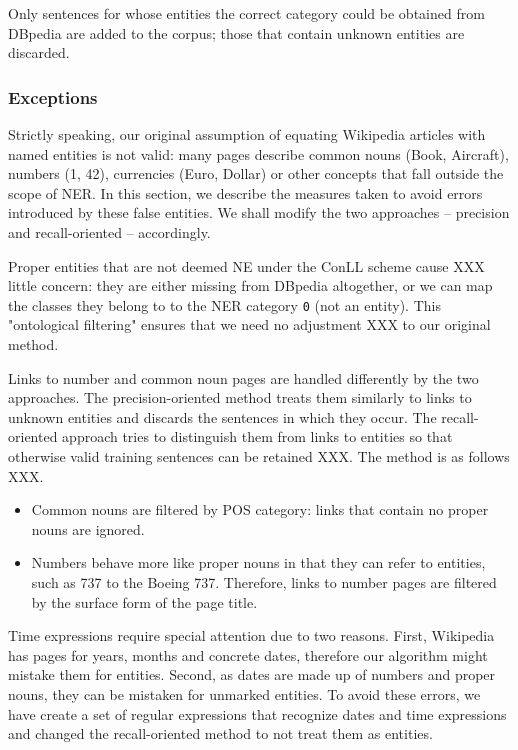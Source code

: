 \documentclass[11pt]{article}
\begin{document}
Only sentences for whose entities the correct category could be obtained from DBpedia are added to the corpus; those that contain unknown entities are discarded. 



\subsubsection{Exceptions}

Strictly speaking, our original assumption of equating Wikipedia articles with named entities is not valid: many pages describe common nouns (Book, Aircraft), numbers (1, 42), currencies (Euro, Dollar) or other concepts that fall outside the scope of NER. In this section, we describe the measures taken to avoid errors introduced by these false entities. We shall modify the two approaches -- precision and recall-oriented -- accordingly.

Proper entities that are not deemed NE under the ConLL scheme cause XXX little concern: they are either missing from DBpedia altogether, or we can map the classes they belong to to the NER category \texttt{0} (not an entity). This "ontological filtering" ensures that we need no adjustment XXX to our original method.

Links to number and common noun pages are handled differently by the two approaches. The precision-oriented method treats them similarly to links to unknown entities and discards the sentences in which they occur. The recall-oriented approach tries to distinguish them from links to entities so that otherwise valid training sentences can be retained XXX. The method is as follows XXX.
\begin{itemize}
\item Common nouns are filtered by POS category: links that contain no proper nouns are ignored.
\item Numbers behave more like proper nouns in that they can refer to entities, such as 737 to the Boeing 737. Therefore, links to number pages are filtered by the surface form of the page title.
\end{itemize}

Time expressions require special attention due to two reasons. First, Wikipedia has pages for years, months and concrete dates, therefore our algorithm might mistake them for entities. Second, as dates are made up of numbers and proper nouns, they can be mistaken for unmarked entities. To avoid these errors, we have create a set of regular expressions that recognize dates and time expressions and changed the recall-oriented method to not treat them as entities.
\end{document}
